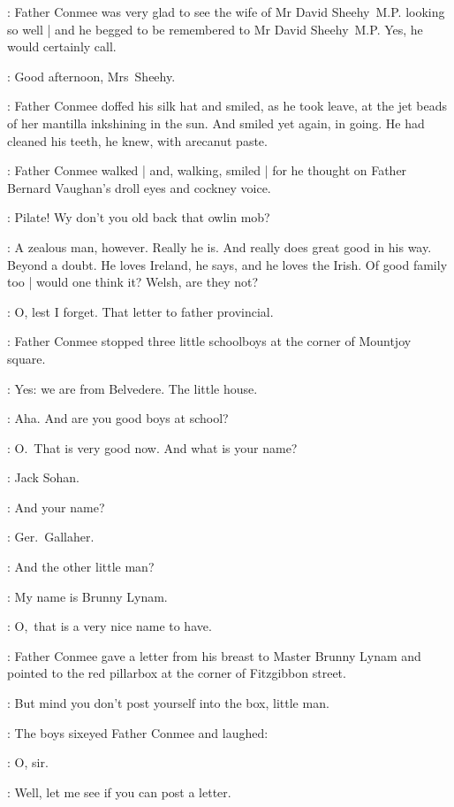 :
Father Conmee was very glad 
to see the wife of Mr David Sheehy~M.P. looking so well |
and he begged to be remembered to Mr David Sheehy~M.P.
Yes, he would certainly call.

\conmee:
Good afternoon, Mrs~Sheehy.


:
Father Conmee doffed his silk hat and smiled,
as he took leave,
at the jet beads of her mantilla inkshining in the sun.
And smiled yet again, in going.
He had cleaned his teeth, he knew, with arecanut paste.

:
Father Conmee walked |
and, walking, smiled |
for he thought on
Father Bernard Vaughan's droll eyes and cockney voice.

\conmeeint: 
Pilate!
Wy don't you old back that owlin mob?

\conmeeint:
A zealous man, however.
Really he is.
And really does great good in his way.
Beyond a doubt.
He loves Ireland, he says, and he loves the Irish.
Of good family too |
would one think it?
Welsh, are they not?

\conmeeint:
O, lest I forget.
That letter to father provincial.

:
Father Conmee stopped three little schoolboys
at the corner of Mountjoy square.

\Boys:
Yes: we are from Belvedere.
The little house.

\conmee:
Aha.
And are you good boys at school?

\conmee:
O.~That is very good now.
And what is your name?

:
Jack Sohan.

\conmee:
And your name?

:
Ger.~Gallaher.

\conmee:
And the other little man?

:
My name is Brunny Lynam.

\conmee:
O,~that is a very nice name to have.

:
Father Conmee gave a letter from his breast to Master Brunny Lynam
and pointed to the red pillarbox at the corner of Fitzgibbon street.

\conmee:
But mind you don't post yourself into the box, little man.

:
The boys sixeyed Father Conmee and laughed:

\Boys:
O, sir.

\conmee:
Well, let me see if you can post a letter.

